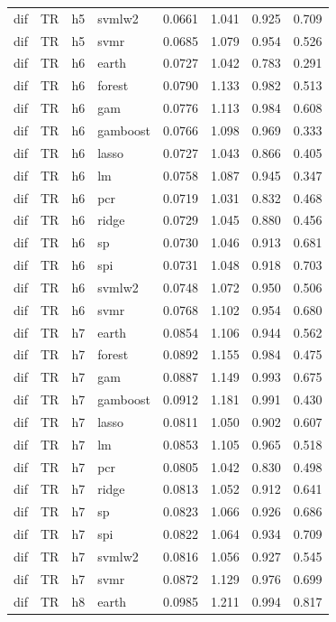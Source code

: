 \begin{ThreePartTable}
\begin{longtable}[t]{llclcccc}
dif & TR & h5 & svmlw2 & 0.0661 & 1.041 & 0.925 & 0.709\\
dif & TR & h5 & svmr & 0.0685 & 1.079 & 0.954 & 0.526\\
\addlinespace
dif & TR & h6 & earth & 0.0727 & 1.042 & 0.783 & 0.291\\
dif & TR & h6 & forest & 0.0790 & 1.133 & 0.982 & 0.513\\
dif & TR & h6 & gam & 0.0776 & 1.113 & 0.984 & 0.608\\
dif & TR & h6 & gamboost & 0.0766 & 1.098 & 0.969 & 0.333\\
dif & TR & h6 & lasso & 0.0727 & 1.043 & 0.866 & 0.405\\
dif & TR & h6 & lm & 0.0758 & 1.087 & 0.945 & 0.347\\
dif & TR & h6 & pcr & 0.0719 & 1.031 & 0.832 & 0.468\\
dif & TR & h6 & ridge & 0.0729 & 1.045 & 0.880 & 0.456\\
dif & TR & h6 & sp & 0.0730 & 1.046 & 0.913 & 0.681\\
dif & TR & h6 & spi & 0.0731 & 1.048 & 0.918 & 0.703\\
dif & TR & h6 & svmlw2 & 0.0748 & 1.072 & 0.950 & 0.506\\
dif & TR & h6 & svmr & 0.0768 & 1.102 & 0.954 & 0.680\\
\addlinespace
dif & TR & h7 & earth & 0.0854 & 1.106 & 0.944 & 0.562\\
dif & TR & h7 & forest & 0.0892 & 1.155 & 0.984 & 0.475\\
dif & TR & h7 & gam & 0.0887 & 1.149 & 0.993 & 0.675\\
dif & TR & h7 & gamboost & 0.0912 & 1.181 & 0.991 & 0.430\\
dif & TR & h7 & lasso & 0.0811 & 1.050 & 0.902 & 0.607\\
dif & TR & h7 & lm & 0.0853 & 1.105 & 0.965 & 0.518\\
dif & TR & h7 & pcr & 0.0805 & 1.042 & 0.830 & 0.498\\
dif & TR & h7 & ridge & 0.0813 & 1.052 & 0.912 & 0.641\\
dif & TR & h7 & sp & 0.0823 & 1.066 & 0.926 & 0.686\\
dif & TR & h7 & spi & 0.0822 & 1.064 & 0.934 & 0.709\\
dif & TR & h7 & svmlw2 & 0.0816 & 1.056 & 0.927 & 0.545\\
dif & TR & h7 & svmr & 0.0872 & 1.129 & 0.976 & 0.699\\
\addlinespace
dif & TR & h8 & earth & 0.0985 & 1.211 & 0.994 & 0.817\\

\end{longtable}
\end{ThreePartTable}
